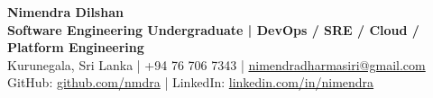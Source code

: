 \documentclass[10pt,a4paper]{article}
\begin{document}
\begin{center}
  {\fontsize{24}{28}\selectfont\bfseries Nimendra Dilshan}\\[2pt]
  {\fontsize{11}{13}\selectfont\bfseries Software Engineering Undergraduate | DevOps / SRE / Cloud / Platform Engineering}\\[4pt]
  Kurunegala, Sri Lanka | +94 76 706 7343 | \href{mailto:nimendradharmasiri@gmail.com}{nimendradharmasiri@gmail.com}\\[2pt]
  GitHub: \href{https://github.com/nmdra}{github.com/nmdra} | LinkedIn: \href{https://www.linkedin.com/in/nimendra}{linkedin.com/in/nimendra}
\end{center}







\end{document}
